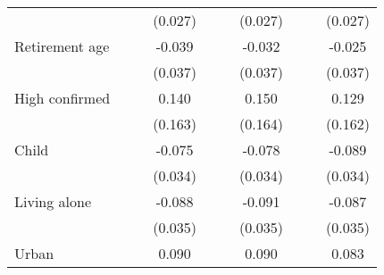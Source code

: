 {\begin{tabular}{l*{9}{c}}
                    &                     &                     &     (0.027)         &                     &                     &     (0.027)         &                     &                     &     (0.027)         \\
\addlinespace
Retirement age      &                     &                     &      -0.039         &                     &                     &      -0.032         &                     &                     &      -0.025         \\
                    &                     &                     &     (0.037)         &                     &                     &     (0.037)         &                     &                     &     (0.037)         \\
\addlinespace
High confirmed      &                     &                     &       0.140         &                     &                     &       0.150         &                     &                     &       0.129         \\
                    &                     &                     &     (0.163)         &                     &                     &     (0.164)         &                     &                     &     (0.162)         \\
\addlinespace
Child               &                     &                     &      -0.075\sym{**} &                     &                     &      -0.078\sym{**} &                     &                     &      -0.089\sym{***}\\
                    &                     &                     &     (0.034)         &                     &                     &     (0.034)         &                     &                     &     (0.034)         \\
\addlinespace
Living alone        &                     &                     &      -0.088\sym{**} &                     &                     &      -0.091\sym{**} &                     &                     &      -0.087\sym{**} \\
                    &                     &                     &     (0.035)         &                     &                     &     (0.035)         &                     &                     &     (0.035)         \\
\addlinespace
Urban               &                     &                     &       0.090\sym{**} &                     &                     &       0.090\sym{**} &                     &                     &       0.083\sym{**} \\

\end{tabular}}
